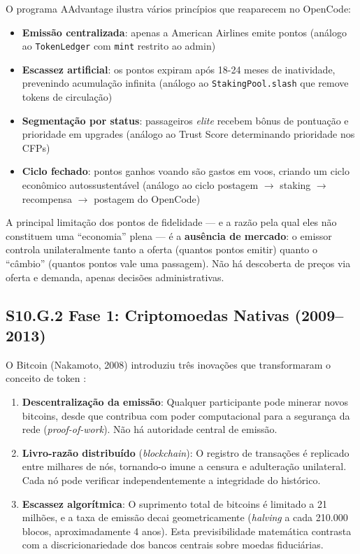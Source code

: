 O programa AAdvantage ilustra vários princípios que reaparecem no OpenCode:
\begin{itemize}
    \item \textbf{Emissão centralizada}: apenas a American Airlines emite pontos (análogo ao \texttt{TokenLedger} com \texttt{mint} restrito ao admin)
    \item \textbf{Escassez artificial}: os pontos expiram após 18-24 meses de inatividade, prevenindo acumulação infinita (análogo ao \texttt{StakingPool.slash} que remove tokens de circulação)
    \item \textbf{Segmentação por status}: passageiros \textit{elite} recebem bônus de pontuação e prioridade em upgrades (análogo ao Trust Score determinando prioridade nos CFPs)
    \item \textbf{Ciclo fechado}: pontos ganhos voando são gastos em voos, criando um ciclo econômico autossustentável (análogo ao ciclo postagem $\to$ staking $\to$ recompensa $\to$ postagem do OpenCode)
\end{itemize}

A principal limitação dos pontos de fidelidade --- e a razão pela qual eles não constituem uma ``economia'' plena --- é a \textbf{ausência de mercado}: o emissor controla unilateralmente tanto a oferta (quantos pontos emitir) quanto o ``câmbio'' (quantos pontos vale uma passagem). Não há descoberta de preços via oferta e demanda, apenas decisões administrativas.

\subsection*{S10.G.2 Fase 1: Criptomoedas Nativas (2009--2013)}

O Bitcoin (Nakamoto, 2008) introduziu três inovações que transformaram o conceito de token \cite{nakamoto2008}:

\begin{enumerate}
    \item \textbf{Descentralização da emissão}: Qualquer participante pode minerar novos bitcoins, desde que contribua com poder computacional para a segurança da rede (\textit{proof-of-work}). Não há autoridade central de emissão.
    
    \item \textbf{Livro-razão distribuído} (\textit{blockchain}): O registro de transações é replicado entre milhares de nós, tornando-o imune a censura e adulteração unilateral. Cada nó pode verificar independentemente a integridade do histórico.
    
    \item \textbf{Escassez algorítmica}: O suprimento total de bitcoins é limitado a 21 milhões, e a taxa de emissão decai geometricamente (\textit{halving} a cada 210.000 blocos, aproximadamente 4 anos). Esta previsibilidade matemática contrasta com a discricionariedade dos bancos centrais sobre moedas fiduciárias.
\end{enumerate}

